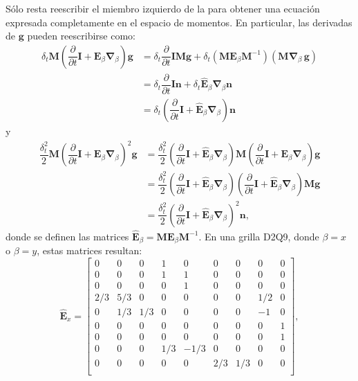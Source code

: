 S\'olo resta reescribir el miembro izquierdo de la  para obtener una ecuaci\'on expresada completamente en el espacio de momentos. En particular, las derivadas de $\bm{g}$ pueden reescribirse como:
\begin{equation}
	\begin{aligned}
		\delta_t \bm{M}\left( \dfrac{\partial}{\partial t} \bm{I} + \bm{E}_{\beta}\bm{\nabla}_{\beta} \right) \bm{g} &= \delta_t \dfrac{\partial}{\partial t}\bm{IMg} + \delta_t ( \bm{M} \bm{E}_{\beta} \bm{M}^{-1} )( \bm{M} \bm{\nabla}_{\beta} \, \bm{g}) \\
		&= \delta_t \dfrac{\partial}{\partial t}\bm{In} + \delta_t \hat{\bm{E}}_{\beta} \bm{\nabla}_{\beta} \bm{n} \\
		&= \delta_t\left( \dfrac{\partial}{\partial t}\bm{I} + \hat{\bm{E}}_{\beta} \bm{\nabla}_{\beta} \right) \bm{n}
	\end{aligned}
	\label{eq:M_propag_1}
\end{equation}
y
\begin{equation}
	\begin{aligned}
		\dfrac{\delta^2_t}{2} \bm{M}\left( \dfrac{\partial}{\partial t} \bm{I} + \bm{E}_{\beta}\bm{\nabla}_{\beta} \right)^2 \bm{g} 
		&= \dfrac{\delta^2_t}{2} \left( \dfrac{\partial}{\partial t}\bm{I} + \hat{\bm{E}}_{\beta} \bm{\nabla}_{\beta} \right) \bm{M} \left( \dfrac{\partial}{\partial t}\bm{I} + \bm{E}_{\beta} \bm{\nabla}_{\beta} \right) \bm{g} \\
		&= \dfrac{\delta^2_t}{2} \left( \dfrac{\partial}{\partial t}\bm{I} + \hat{\bm{E}}_{\beta} \bm{\nabla}_{\beta} \right) \left( \dfrac{\partial}{\partial t}\bm{I} + \hat{\bm{E}}_{\beta} \bm{\nabla}_{\beta} \right) \bm{Mg} \\
		&= \dfrac{\delta^2_t}{2} \left( \dfrac{\partial}{\partial t}\bm{I} + \hat{\bm{E}}_{\beta} \bm{\nabla}_{\beta} \right)^2 \bm{n},
	\end{aligned}
	\label{eq:M_propag_2}
\end{equation}
donde se definen las matrices $\hat{\bm{E}}_{\beta} = \bm{M} \bm{E}_{\beta} \bm{M}^{-1}$. En una grilla D2Q9, donde $\beta=x$ o $\beta=y$, estas matrices resultan:
\begin{equation}
	\hat{\bm{E}}_{x}=
	\begin{bmatrix}
	0 & 0 & 0 & 1 & 0 & 0 & 0 & 0 & 0 \\
	0 & 0 & 0 & 1 & 1 & 0 & 0 & 0 & 0 \\
	0 & 0 & 0 & 0 & 1 & 0 & 0 & 0 & 0 \\
	2/3 & 5/3 & 0 & 0 & 0 & 0 & 0 & 1/2 & 0 \\
	0 & 1/3 & 1/3 & 0 & 0 & 0 & 0 & -1 & 0 \\
	0 & 0 & 0 & 0 & 0 & 0 & 0 & 0 & 1 \\
	0 & 0 & 0 & 0 & 0 & 0 & 0 & 0 & 1 \\
	0 & 0 & 0 & 1/3 & -1/3 & 0 & 0 & 0 & 0 \\
	0 & 0 & 0 & 0 & 0 & 2/3 & 1/3 & 0 & 0 \\
	\end{bmatrix},
\end{equation} 

